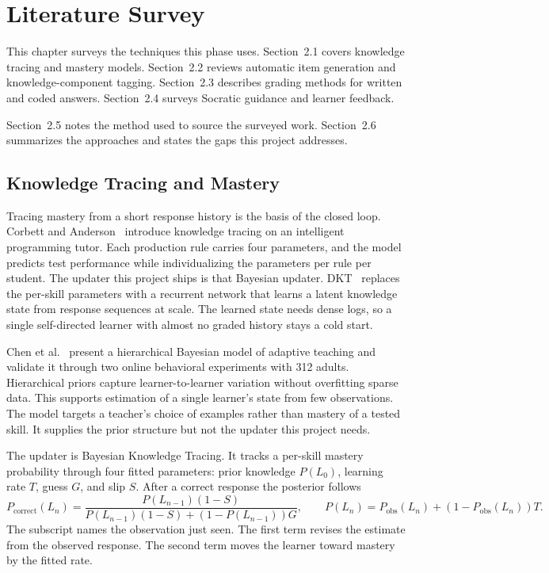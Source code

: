 \chapter{Literature Survey}
This chapter surveys the techniques this phase uses. Section~2.1 covers knowledge tracing and mastery models. Section~2.2 reviews automatic item generation and knowledge-component tagging. Section~2.3 describes grading methods for written and coded answers. Section~2.4 surveys Socratic guidance and learner feedback.

Section~2.5 notes the method used to source the surveyed work. Section~2.6 summarizes the approaches and states the gaps this project addresses.

\section{Knowledge Tracing and Mastery}
Tracing mastery from a short response history is the basis of the closed loop. Corbett and Anderson~\cite{corbett1995} introduce knowledge tracing on an intelligent programming tutor. Each production rule carries four parameters, and the model predicts test performance while individualizing the parameters per rule per student. The updater this project ships is that Bayesian updater. DKT~\cite{piech2015} replaces the per-skill parameters with a recurrent network that learns a latent knowledge state from response sequences at scale. The learned state needs dense logs, so a single self-directed learner with almost no graded history stays a cold start.

Chen et al.~\cite{chen2024} present a hierarchical Bayesian model of adaptive teaching and validate it through two online behavioral experiments with 312 adults. Hierarchical priors capture learner-to-learner variation without overfitting sparse data. This supports estimation of a single learner's state from few observations. The model targets a teacher's choice of examples rather than mastery of a tested skill. It supplies the prior structure but not the updater this project needs.

The updater is Bayesian Knowledge Tracing. It tracks a per-skill mastery probability through four fitted parameters: prior knowledge $P(L_0)$, learning rate $T$, guess $G$, and slip $S$. After a correct response the posterior follows
\begin{equation}
P_{\text{correct}}(L_n) = \frac{P(L_{n-1})(1-S)}{P(L_{n-1})(1-S) + (1-P(L_{n-1}))G}, \qquad P(L_n) = P_{\text{obs}}(L_n) + (1-P_{\text{obs}}(L_n))T.
\label{eq:bkt-update}
\end{equation}
The subscript names the observation just seen. The first term revises the estimate from the observed response. The second term moves the learner toward mastery by the fitted rate.

